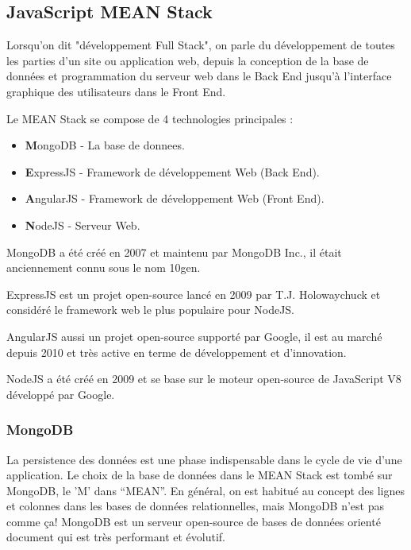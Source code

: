 \subsection{JavaScript MEAN Stack}

Lorsqu'on dit "développement Full Stack", on parle du développement de toutes les parties d'un site ou application web, depuis la conception de la base de données et programmation du serveur web dans le Back End jusqu'à l'interface graphique des utilisateurs dans le Front End.
\newline

Le MEAN\cite{gettingMEAN} Stack se compose de 4 technologies principales :
\begin{itemize}
\item \textbf{M}ongoDB - La base de donnees.
\item \textbf{E}xpressJS - Framework de développement Web (Back End).
\item \textbf{A}ngularJS - Framework de développement Web (Front End).
\item \textbf{N}odeJS - Serveur Web.
\newline
\end{itemize}


MongoDB a été créé en 2007 et maintenu par MongoDB Inc., il était anciennement connu sous le nom 10gen.
\newline

ExpressJS est un projet open-source lancé en 2009 par T.J. Holowaychuck et considéré le framework web le plus populaire pour NodeJS.
\newline

AngularJS aussi un projet open-source supporté par Google, il est au marché depuis 2010 et très active en terme de développement et d'innovation.
\newline

NodeJS a été créé en 2009 et se base sur le moteur open-source de JavaScript V8 développé par Google.

\subsubsection{MongoDB}

La persistence des données est une phase indispensable dans le cycle de vie d'une application. Le choix de la base de données dans le MEAN Stack est tombé sur MongoDB, le 'M' dans ``MEAN''. En général, on est habitué au concept des lignes et colonnes dans les bases de données relationnelles, mais MongoDB n'est pas comme ça! MongoDB est un serveur open-source de bases de données orienté document\cite{documentDB} qui est très performant et évolutif.
\newline

